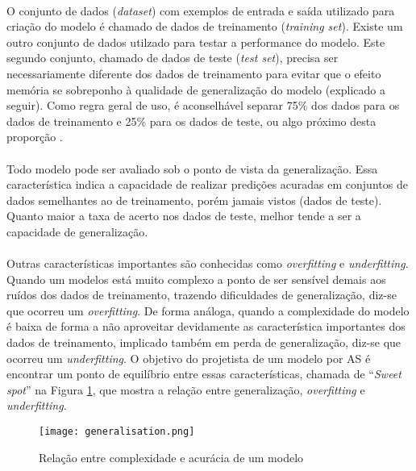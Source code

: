 \paragraph{} O conjunto de dados (\textit{dataset}) com exemplos de entrada e saída utilizado para criação do modelo é chamado de dados de treinamento (\textit{training set}). Existe um outro conjunto de dados utilzado para testar a performance do modelo. Este segundo conjunto, chamado de dados de teste (\textit{test set}), precisa ser necessariamente diferente dos dados de treinamento para evitar que o efeito memória se sobreponho à qualidade de generalização do modelo (explicado a seguir). Como regra geral de uso, é aconselhável separar 75\% dos dados para os dados de treinamento e 25\% para os dados de teste, ou algo próximo desta proporção \cite{muller2016introduction}.

\paragraph{} Todo modelo pode ser avaliado sob o ponto de vista da generalização. Essa característica indica a capacidade de realizar predições acuradas em conjuntos de dados semelhantes ao de treinamento, porém jamais vistos (dados de teste). Quanto maior a taxa de acerto nos dados de teste, melhor tende a ser a capacidade de generalização.

\paragraph{} Outras características importantes são conhecidas como \textit{overfitting} e \textit{underfitting}. Quando um modelos está muito complexo a ponto de ser sensível demais aos ruídos dos dados de treinamento, trazendo dificuldades de generalização, diz-se que ocorreu um \textit{overfitting}. De forma análoga, quando a complexidade do modelo é baixa de forma a não aproveitar devidamente as característica importantes dos dados de treinamento, implicado também em perda de generalização, diz-se que ocorreu um \textit{underfitting}. O objetivo do projetista de um modelo por AS é encontrar um ponto de equilíbrio entre essas características, chamada de ``\textit{Sweet spot}'' na Figura \ref{fig:6}, que mostra a relação entre generalização, \textit{overfitting} e \textit{underfitting}.

\begin{figure}[h]
    \texttt{[image: generalisation.png]}
    \centering
    \caption{Relação entre complexidade e acur\'acia de um modelo \cite{muller2016introduction}}
    \label{fig:6}
\end{figure}

